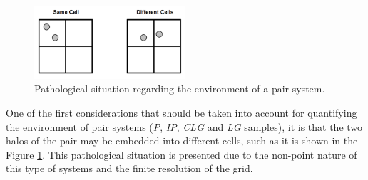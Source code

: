 \begin{figure}[htbp]
	\centering
	\includegraphics[width=0.5\textwidth]
	{./figures/4_results/Pathogenic_Situation.png}
	
	\caption{\small{Pathological situation regarding the environment of a
	pair system.}}
	\label{fig:Pathogenic_Situation}
\end{figure}


One of the first considerations that should be taken into account for 
quantifying the environment of pair systems (\textit{P}, \textit{IP}, 
\textit{CLG} and \textit{LG} samples), it is that the two halos of the 
pair may be embedded into different cells, such as it is shown in the 
Figure \ref{fig:Pathogenic_Situation}. This pathological situation is 
presented due to the non-point nature of this type of systems and the 
finite resolution of the grid.


